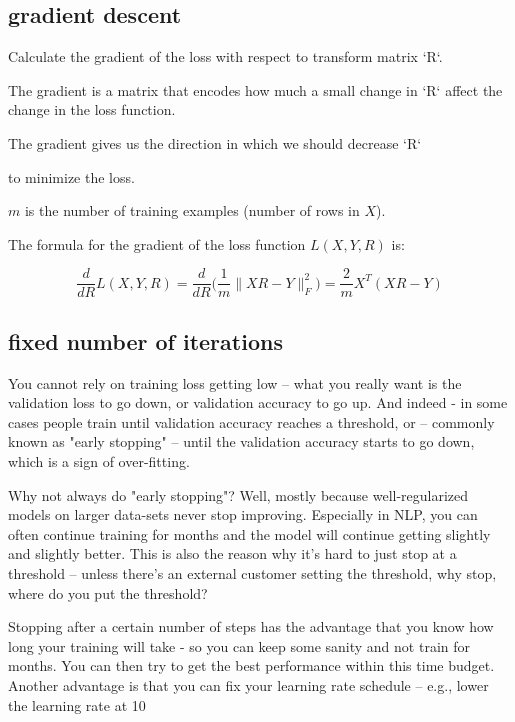 \documentclass[4apaper,12pt]{book}
\begin{document}
\subsection {gradient descent}
\begin{description}
\item Calculate the gradient of the loss with respect to transform matrix `R`.
\item The gradient is a matrix that encodes how much a small change in `R` affect the change in the loss function.
\item The gradient gives us the direction in which we should decrease `R`
\item to minimize the loss.
\item $m$ is the number of training examples (number of rows in $X$).
\item The formula for the gradient of the loss function $L(X,Y,R)$ is:
\item $$\frac{d}{dR}L(X,Y,R)=\frac{d}{dR}\Big(\frac{1}{m}\| X R -Y\|_{F}^{2}\Big) = \frac{2}{m}X^{T} (X R - Y)$$

\subsection{fixed number of iterations}
\item You cannot rely on training loss getting low -- what you really want is the validation loss to go down, or validation accuracy to go up. And indeed - in some cases people train until validation accuracy reaches a threshold, or -- commonly known as "early stopping" -- until the validation accuracy starts to go down, which is a sign of over-fitting.
\item Why not always do "early stopping"? Well, mostly because well-regularized models on larger data-sets never stop improving. Especially in NLP, you can often continue training for months and the model will continue getting slightly and slightly better. This is also the reason why it's hard to just stop at a threshold -- unless there's an external customer setting the threshold, why stop, where do you put the threshold?
\item Stopping after a certain number of steps has the advantage that you know how long your training will take - so you can keep some sanity and not train for months. You can then try to get the best performance within this time budget. Another advantage is that you can fix your learning rate schedule -- e.g., lower the learning rate at 10%


\end{description}
\end{document}
